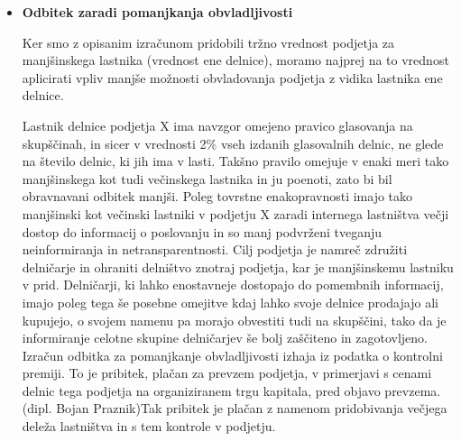 \documentclass[12pt,a4paper]{amsart}
\theoremstyle{definition} %
\theoremstyle{plain} %
\begin{document}
\begin{itemize}
\item{\textbf{Odbitek zaradi pomanjkanja obvladljivosti}}

Ker smo z opisanim izračunom pridobili tržno vrednost podjetja za manjšinskega lastnika (vrednost ene delnice), moramo najprej na to vrednost aplicirati vpliv manjše možnosti obvladovanja podjetja z vidika lastnika ene delnice.\par
Lastnik delnice podjetja X ima navzgor omejeno pravico glasovanja na skupščinah, in sicer v vrednosti 2\% vseh izdanih glasovalnih delnic, ne glede na število delnic, ki jih ima v lasti. Takšno pravilo omejuje v enaki meri tako manjšinskega kot tudi večinskega lastnika in ju poenoti, zato bi bil obravnavani odbitek manjši. Poleg tovrstne enakopravnosti imajo tako manjšinski kot večinski lastniki v podjetju X zaradi internega lastništva večji dostop do informacij o poslovanju in so manj podvrženi tveganju neinformiranja in netransparentnosti. Cilj podjetja je namreč združiti delničarje in ohraniti delništvo znotraj podjetja, kar je manjšinskemu lastniku v prid. Delničarji, ki lahko enostavneje dostopajo do pomembnih informacij, imajo poleg tega še posebne omejitve kdaj lahko svoje delnice prodajajo ali kupujejo, o svojem namenu pa morajo obvestiti tudi na skupščini, tako da je informiranje celotne skupine delničarjev še bolj zaščiteno in zagotovljeno. \\
Izračun odbitka za pomanjkanje obvladljivosti izhaja iz podatka o kontrolni premiji. To je pribitek, plačan za prevzem podjetja, v primerjavi s cenami delnic tega podjetja na organiziranem trgu kapitala, pred objavo prevzema. (dipl. Bojan Praznik)\newline Tak pribitek je plačan z namenom pridobivanja večjega deleža lastništva in s tem kontrole v podjetju.\\
\newline

\end{itemize}
\end{document}
